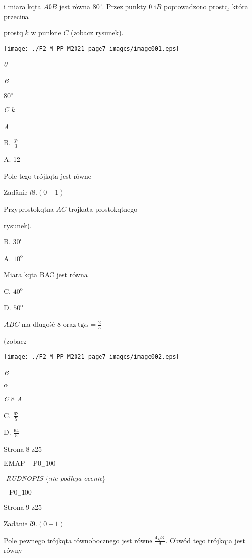 \documentclass[a4paper,12pt]{article}
\begin{document}
i miara kqta $A0B$ jest równa $80^{\mathrm{o}}$. Przez punkty 0 $\mathrm{i} B$ poprowadzono prostq, która przecina

prostq $k$ w punkcie $C$ (zobacz rysunek).
\begin{center}
\texttt{[image: ./F2\_M\_PP\_M2021\_page7\_images/image001.eps]}
\end{center}
{\it 0}

{\it B}

$80^{\mathrm{o}}$

{\it C  k}

{\it A}

B. $\displaystyle \frac{37}{3}$

A. 12

Pole tego trójkqta jest równe

Zadänie $l8. (0-1)$

Przyprostokqtna $AC$ trójkata prostokqtnego

rysunek).

B. $30^{\mathrm{o}}$

A. $10^{\mathrm{o}}$

Miara kqta BAC jest równa

C. $40^{\mathrm{o}}$

D. $50^{\mathrm{o}}$

$ABC$ ma dlugośč 8 oraz $\displaystyle \mathrm{t}\mathrm{g}\alpha=\frac{2}{5}$

(zobacz
\begin{center}
\texttt{[image: ./F2\_M\_PP\_M2021\_page7\_images/image002.eps]}
\end{center}
{\it B}

$\alpha$

{\it C} 8  {\it A}

C. $\displaystyle \frac{62}{5}$

D. $\displaystyle \frac{64}{5}$

Strona 8 z25

$\mathrm{E}\mathrm{M}\mathrm{A}\mathrm{P}-\mathrm{P}0_{-}100$





-{\it RUDNOPIS} \{{\it nie podlega ocenie}\}

$-\mathrm{P}0_{-}100$

Strona 9 z25





Zadänie $l9. (0-1)$

Pole pewnego trójkqta równobocznego jest równe $\displaystyle \frac{4\sqrt{3}}{9}$. Obwód tego trójkqta jest równy
\end{document}
